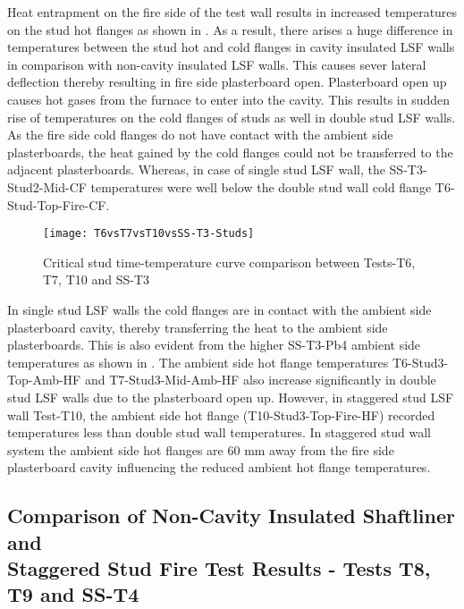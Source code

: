 Heat entrapment on the fire side of the test wall results in increased temperatures on the stud hot flanges as shown in . As a result, there arises a huge difference in temperatures between the stud hot and cold flanges in cavity insulated LSF walls in comparison with non-cavity insulated LSF walls. This causes sever lateral deflection thereby resulting in fire side plasterboard open. Plasterboard open up causes hot gases from the furnace to enter into the cavity. This results in sudden rise of temperatures on the cold flanges of studs as well in double stud LSF walls. As the fire side cold flanges do not have contact with the ambient side plasterboards, the heat gained by the cold flanges could not be transferred to the adjacent plasterboards. Whereas, in case of single stud LSF wall, the SS-T3-Stud2-Mid-CF temperatures were well below the double stud wall cold flange T6-Stud-Top-Fire-CF. 
\begin{figure}[htbp]
	\centering
		\texttt{[image: T6vsT7vsT10vsSS-T3-Studs]}  
	\caption{Critical stud time-temperature curve comparison between Tests-T6, T7, T10 and SS-T3}
	\label{fig:T6vsT7vsT10vsSS-T3-Studs}
\end{figure}

In single stud LSF walls the cold flanges are in contact with the ambient side plasterboard cavity, thereby transferring the heat to the ambient side plasterboards. This is also evident from the higher SS-T3-Pb4 ambient side temperatures as shown in . The ambient side hot flange temperatures T6-Stud3-Top-Amb-HF and T7-Stud3-Mid-Amb-HF also increase significantly in double stud LSF walls due to the plasterboard open up. However, in staggered stud LSF wall Test-T10, the ambient side hot flange (T10-Stud3-Top-Fire-HF) recorded temperatures less than double stud wall temperatures. In staggered stud wall system the ambient side hot flanges are 60 mm away from the fire side plasterboard cavity influencing the reduced ambient hot flange temperatures.      

\subsection{Comparison of Non-Cavity Insulated Shaftliner and\\Staggered Stud Fire Test Results - Tests T8, T9 and SS-T4}


